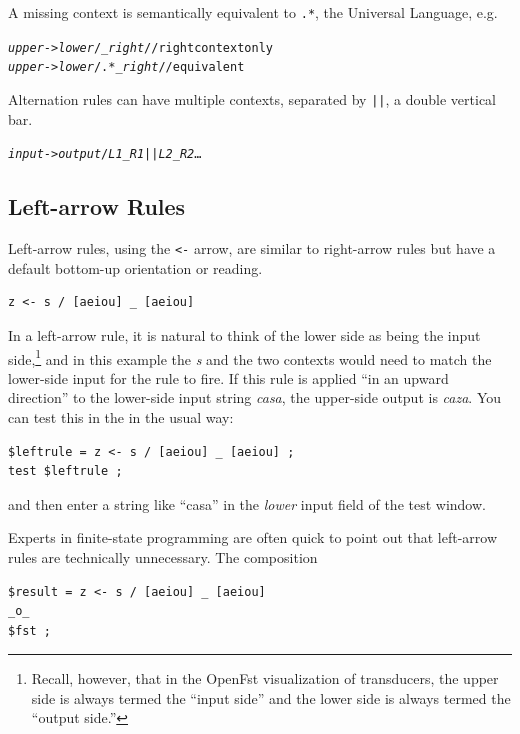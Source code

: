\noindent
A missing context is semantically equivalent to \verb!.*!, the Universal Language, e.g.

\begin{alltt}
\emph{upper} -> \emph{lower} /    _ \emph{right}	    // right context only
\emph{upper} -> \emph{lower} / .* _ \emph{right}	    // equivalent
\end{alltt}


Alternation rules can have multiple contexts, separated by \texttt{||}, a double vertical bar.

\begin{alltt}
\emph{input} -> \emph{output} / \emph{L1} _ \emph{R1} || \emph{L2} _ \emph{R2} \ldots
\end{alltt}

\subsection{Left-arrow Rules}

Left-arrow rules, using the \texttt{<-} arrow, are similar to right-arrow
rules but have a default bottom-up orientation or reading.

\begin{Verbatim}
z <- s / [aeiou] _ [aeiou]
\end{Verbatim}

\noindent
In a left-arrow rule, it is natural to think of the lower side as being the input side,\footnote{Recall,
however, that in the OpenFst visualization of transducers, the upper side is always termed the ``input
side'' and the lower side is always termed the ``output side.''} and in this example the
\emph{s} and
the two contexts would need to match the lower-side input for the rule to fire.  If this rule is
applied ``in an upward direction'' to the lower-side input string \emph{casa}, the upper-side output
is \emph{caza}.  You can test this in the  in the usual way:


\begin{Verbatim}
$leftrule = z <- s / [aeiou] _ [aeiou] ;
test $leftrule ;
\end{Verbatim}

\noindent
and then enter a string like ``casa'' in the \emph{lower} input field of the test window.


Experts in finite-state programming are often quick to point out that left-arrow rules
are technically unnecessary.  The composition

\begin{Verbatim}
$result = z <- s / [aeiou] _ [aeiou] 
_o_ 
$fst ;
\end{Verbatim}

